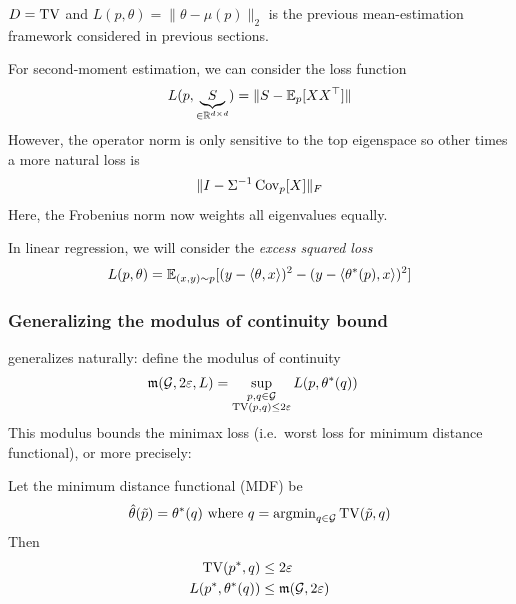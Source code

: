 \begin{example}
  $D = \operatorname{TV}$ and $L(p, \theta) = \|\theta - \mu(p)\|_2$
  is the previous mean-estimation framework considered in previous sections.

  For second-moment estimation, we can consider the loss function
  \begin{align}
    L(p, \underbrace{S}_{\in \mathbb{R}^{d \times d}}) = \|S - \mathbb{E}_p[X X^\top] \|
  \end{align}
  However, the operator norm is only sensitive to the top eigenspace
  so other times a more natural loss is
  \begin{align}
    \|I - \Sigma^{-1} \operatorname{Cov}_p[X]\|_F
  \end{align}
  Here, the Frobenius norm now weights all eigenvalues equally.

  In linear regression, we will consider the \emph{excess squared loss}
  \begin{align}
    L(p, \theta) = \mathbb{E}_{(x,y) \sim p}[(y - \braket{\theta, x})^2 - (y - \braket{\theta^*(p), x})^2]
  \end{align}
\end{example}

\subsubsection{Generalizing the modulus of continuity bound}

generalizes naturally: define the modulus of continuity
\begin{align}
  \mathfrak{m}(\mathcal{G}, 2\varepsilon, L) &= \sup_{\substack{p, q \in \mathcal{G} \\ \operatorname{TV}(p,q) \leq 2 \varepsilon}}
  L(p, \theta^*(q))
\end{align}
This modulus bounds the minimax loss (i.e.\ worst loss for minimum distance functional),
or more precisely:
\begin{proposition}
  Let the minimum distance functional (MDF) be
  \begin{align}
    \hat\theta(\tilde{p}) = \theta^*(q)~\text{where}~q = \operatorname{argmin}_{q \in \mathcal{G}} \operatorname{TV}(\tilde{p}, q)
  \end{align}
  Then
  \begin{align}
    \operatorname{TV}(p^*, q) &\leq 2 \varepsilon \\
    L(p^*, \theta^*(q)) &\leq \mathfrak{m}(\mathcal{G}, 2 \varepsilon)
  \end{align}
\end{proposition}

